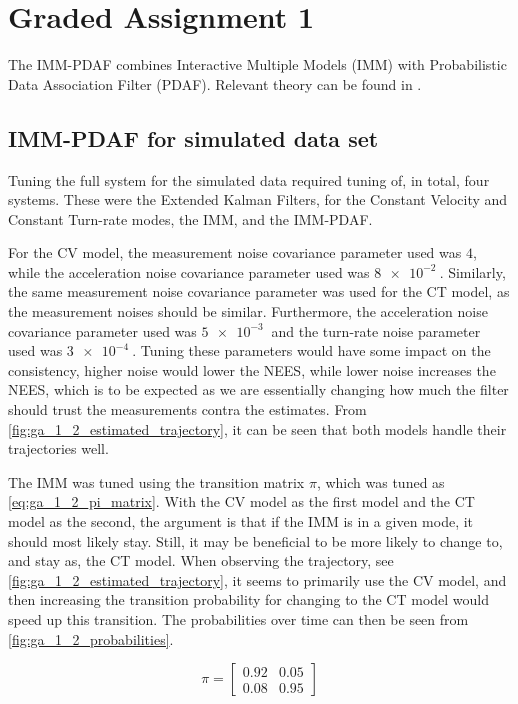 \section{Graded Assignment 1}\label{sec:graded_assignment_1}
The IMM-PDAF combines Interactive Multiple Models (IMM) with Probabilistic Data Association Filter (PDAF). Relevant theory can be found in \cite[p. 100-101, 120 - 122]{Edmund}. 

\subsection{IMM-PDAF for simulated data set}
Tuning the full system for the simulated data required tuning of, in total, four systems. These were the Extended Kalman Filters, for the Constant Velocity and Constant Turn-rate modes, the IMM, and the IMM-PDAF. 

For the CV model, the measurement noise covariance parameter used was $4$, while the acceleration noise covariance parameter used was $\SI{8e-2}{}$. Similarly, the same measurement noise covariance parameter was used for the CT model, as the measurement noises should be similar. Furthermore, the acceleration noise covariance parameter used was $\SI{5e-3}{}$ and the turn-rate noise parameter used was $\SI{3e-4}{}$. Tuning these parameters would have some impact on the consistency, higher noise would lower the NEES, while lower noise increases the NEES, which is to be expected as we are essentially changing how much the filter should trust the measurements contra the estimates. From \cref{fig:ga_1_2_estimated_trajectory}, it can be seen that both models handle their trajectories well. 

The IMM was tuned using the transition matrix $\pi$, which was tuned as \cref{eq:ga_1_2_pi_matrix}. With the CV model as the first model and the CT model as the second, the argument is that if the IMM is in a given mode, it should most likely stay. Still, it may be beneficial to be more likely to change to, and stay as, the CT model. When observing the trajectory, see \cref{fig:ga_1_2_estimated_trajectory}, it seems to primarily use the CV model, and then increasing the transition probability for changing to the CT model would speed up this transition. The probabilities over time can then be seen from \cref{fig:ga_1_2_probabilities}.

\begin{equation}
    \label{eq:ga_1_2_pi_matrix}
    \pi = \begin{bmatrix}
        0.92 & 0.05 \\
        0.08 & 0.95
    \end{bmatrix}
\end{equation}

